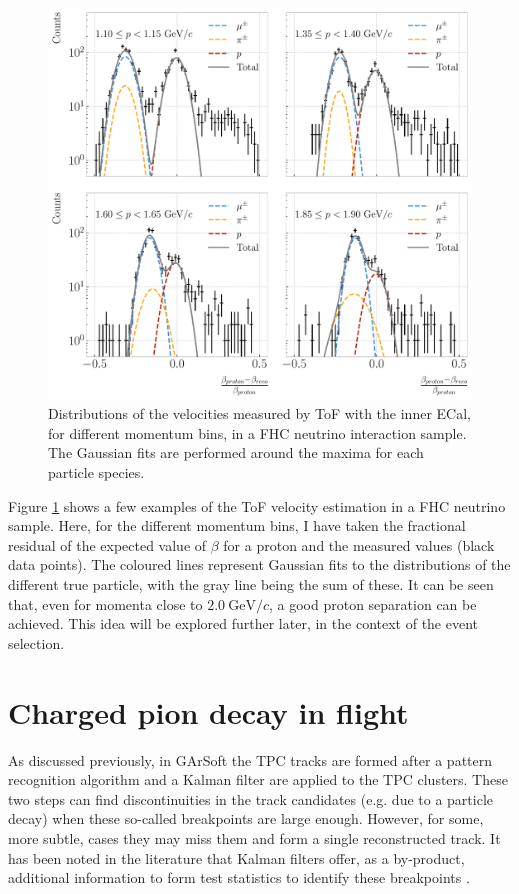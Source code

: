 \begin{figure}[t]
	\centering
	\includegraphics[width=.95\linewidth]{Images/GArSoft_PID/tof/numu_cc_proton_tof_summary.pdf}
	\caption{Distributions of the velocities measured by ToF with the
	inner ECal, for different momentum bins, in a FHC neutrino interaction sample. The Gaussian fits are performed around the maxima for each particle species.}
	\label{fig:tof_beta_fhc}
\end{figure}

Figure \ref{fig:tof_beta_fhc} shows a few examples of the ToF velocity estimation in a FHC neutrino sample. Here, for the different momentum bins, I have taken the fractional residual of the expected value of $\beta$ for a proton and the measured values (black data points). The coloured lines represent Gaussian fits to the distributions of the different true particle, with the gray line being the sum of these. It can be seen that, even for momenta close to $2.0~\mathrm{GeV}/c$, a good proton separation can be achieved. This idea will be explored further later, in the context of the event selection.

\section{Charged pion decay in flight}\label{section:pi_decay}

As discussed previously, in GArSoft the TPC tracks are formed after a pattern recognition algorithm and a Kalman filter are applied to the TPC clusters. These two steps can find discontinuities in the track candidates (e.g. due to a particle decay) when these so-called breakpoints are large enough. However, for some, more subtle, cases they may miss them and form a single reconstructed track. It has been noted in the literature that Kalman filters offer, as a by-product, additional information to form test statistics to identify these breakpoints \cite{Fruehwirth1988, Astier2000}.


